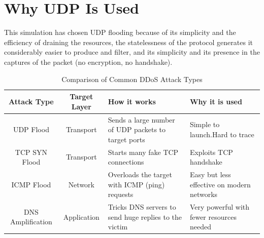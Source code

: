 \section{Why UDP Is Used}
This simulation has chosen UDP flooding because of its simplicity and the efficiency of draining the resources, the statelessness of the protocol generates it considerably easier to produce and filter, and its simplicity and its presence in the captures of the packet (no encryption, no handshake).
\begin{table}[!htb]
    \centering
    \begin{tabular}{|c|c|m{5cm}|m{3cm}|}
    \hline
        Attack Type & Target Layer & How it works & Why it is used\\
    \hline
        UDP Flood & Transport & Sends a large number of UDP packets to target ports & Simple to launch.Hard to trace\\
    \hline
       TCP SYN Flood & Transport & Starts many fake TCP connections & Exploits TCP handshake \\
    \hline
        ICMP Flood & Network & Overloads the target with ICMP (ping) requests & Easy but less effective on modern networks\\
    \hline
        DNS Amplification & Application & Tricks DNS servers to send huge replies to the victim & Very powerful with fewer resources needed \\
    \hline
    \end{tabular}
    \caption{Comparison of Common DDoS Attack Types}
    \label{tab:my_label}
\end{table}
